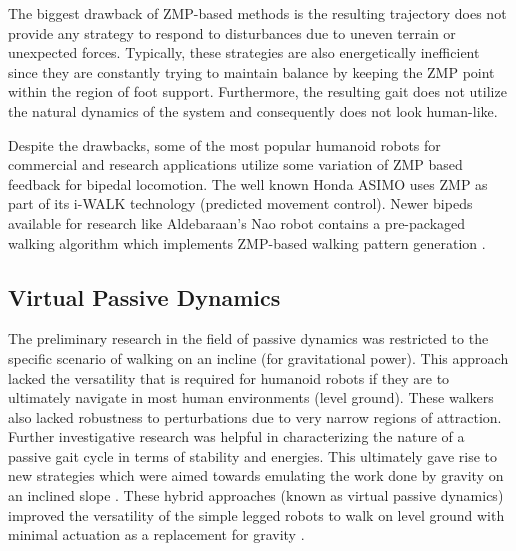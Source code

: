 The biggest drawback of ZMP-based methods is the resulting trajectory does not provide any strategy to respond to disturbances due to uneven terrain or unexpected forces. Typically, these strategies are also energetically inefficient since they are constantly trying to maintain balance by keeping the ZMP point within the region of foot support. Furthermore, the resulting gait does not utilize the natural dynamics of the system and consequently does not look human-like.

Despite the drawbacks, some of the most popular humanoid robots for commercial and research applications utilize some variation of ZMP based feedback for bipedal locomotion. The well known Honda ASIMO \cite{Sakagami:2002cf} uses ZMP as part of its i-WALK technology (predicted movement control). Newer bipeds available for research like Aldebaraan's Nao \cite{Gouaillier2006} robot contains a pre-packaged walking algorithm which implements ZMP-based walking pattern generation \cite{Kajita:2006dx}. 


\subsection{Virtual Passive Dynamics} %
\label{sub:related_passive_dynamics}
The preliminary research in the field of passive dynamics was restricted to the specific scenario of walking on an incline (for gravitational power). This approach lacked the versatility that is required for humanoid robots if they are to ultimately navigate in most human environments (level ground). These walkers also lacked robustness to perturbations due to very narrow regions of attraction. Further investigative research was helpful in characterizing the nature of a passive gait cycle \cite{Goswami:1996gn} in terms of stability and energies. This ultimately gave rise to new strategies which were aimed towards emulating the work done by gravity on an inclined slope \cite{Asano:2000wi}. These hybrid approaches (known as virtual passive dynamics) improved the versatility of the simple legged robots to walk on level ground with minimal actuation as a replacement for gravity \cite{Asano:2004tv}. 

